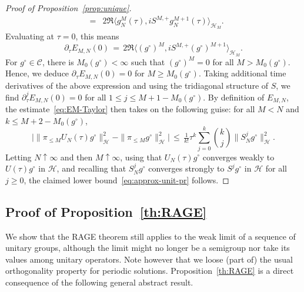 \documentclass[a4paper,11pt,reqno,noindent]{amsart}
\theoremstyle{plain}
\numberwithin{equation}{section}
\newcommand{\Cc}{\mathcal C}
\newcommand{\Hc}{\mathcal H}
\newcommand{\3}{|\!|\!|}
\begin{document}
\begin{proof}[Proof of Proposition~\ref{prop:unique}]
\begin{eqnarray*}
&=&2\Re\langle g_N^M(\tau),iS^{M,+} g_N^{M+1}(\tau)\rangle_{\Hc_M}.
\end{eqnarray*}
Evaluating at $\tau=0$, this means
\begin{equation*}
\partial_\tau E_{M,N}(0)
\,=\,2\Re\langle (g^\circ)^M,iS^{M,+}(g^\circ)^{M+1}\rangle_{\Hc_M}.
\end{equation*}
For $g^\circ\in\Cc$, there is $M_0(g^\circ)<\infty$ such that $(g^\circ)^M=0$ for all $M>M_0(g^\circ)$. Hence, we deduce $\partial_\tau E_{M,N}(0)=0$ for $M\ge M_0(g^\circ)$.
Taking additional time derivatives of the above expression and using the tridiagonal structure of $S$, we find $\partial_\tau^jE_{M,N}(0)=0$ for all $1\le j\le M+1-M_0(g^\circ)$. By definition of $E_{M,N}$, the estimate~\eqref{eq:EM-Taylor} then takes on the following guise: for all $M<N$ and $k\le M+2-M_0(g^\circ)$,
\begin{equation*}
\Big|\|\pi_{\le M}U_N(\tau)g^\circ\|^2_\Hc-\|\pi_{\le M}g^\circ\|^2_\Hc\Big|\,\le\,\tfrac1{k!}\tau^k\sum_{j=0}^k\binom{k}{j}\|S_N^jg^\circ\|_\Hc^2.
\end{equation*}
Letting $N\uparrow\infty$ and then $M\uparrow\infty$, using that $U_N(\tau)g^\circ$ converges weakly to $U(\tau)g^\circ$ in $\Hc$, and
recalling that $S_N^jg^\circ$ converges strongly to $S^jg^\circ$ in $\Hc$ for all $j\ge0$,
the claimed lower bound~\eqref{eq:approx-unit-pr} follows.
\end{proof}


\subsection{Proof of Proposition~\ref{th:RAGE}}\label{sec:RAGE}
We show that the RAGE theorem still applies to the weak limit of a sequence of unitary groups, although the limit might no longer be a semigroup nor take its values among unitary operators. Note however that we loose (part of) the usual orthogonality property for periodic solutions. Proposition~\ref{th:RAGE} is a direct consequence of the following general abstract result.
\end{document}
